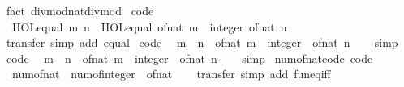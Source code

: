 \begin{isabellebody}
\ {\isacharparenleft}fact\ divmod{\isacharunderscore}nat{\isacharunderscore}div{\isacharunderscore}mod{\isacharparenright}%
\endisatagproof
{\isafoldproof}%
%
\isadelimproof
\isanewline
%
\endisadelimproof
\isanewline
{}\isamarkupfalse%
\ {\isacharbrackleft}code{\isacharbrackright}{\isacharcolon}\isanewline
\ \ {\isachardoublequoteopen}HOL{\isachardot}equal\ m\ n\ {\isacharequal}\ HOL{\isachardot}equal\ {\isacharparenleft}of{\isacharunderscore}nat\ m\ {\isacharcolon}{\isacharcolon}\ integer{\isacharparenright}\ {\isacharparenleft}of{\isacharunderscore}nat\ n{\isacharparenright}{\isachardoublequoteclose}\isanewline
%
\isadelimproof
\ \ %
\endisadelimproof
%
\isatagproof
{}\isamarkupfalse%
\ transfer\ {\isacharparenleft}simp\ add{\isacharcolon}\ equal{\isacharparenright}%
\endisatagproof
{\isafoldproof}%
%
\isadelimproof
\isanewline
%
\endisadelimproof
\isanewline
{}\isamarkupfalse%
\ {\isacharbrackleft}code{\isacharbrackright}{\isacharcolon}\isanewline
\ \ {\isachardoublequoteopen}m\ {\isasymle}\ n\ {\isasymlongleftrightarrow}\ {\isacharparenleft}of{\isacharunderscore}nat\ m\ {\isacharcolon}{\isacharcolon}\ integer{\isacharparenright}\ {\isasymle}\ of{\isacharunderscore}nat\ n{\isachardoublequoteclose}\isanewline
%
\isadelimproof
\ \ %
\endisadelimproof
%
\isatagproof
{}\isamarkupfalse%
\ simp%
\endisatagproof
{\isafoldproof}%
%
\isadelimproof
\isanewline
%
\endisadelimproof
\isanewline
{}\isamarkupfalse%
\ {\isacharbrackleft}code{\isacharbrackright}{\isacharcolon}\isanewline
\ \ {\isachardoublequoteopen}m\ {\isacharless}\ n\ {\isasymlongleftrightarrow}\ {\isacharparenleft}of{\isacharunderscore}nat\ m\ {\isacharcolon}{\isacharcolon}\ integer{\isacharparenright}\ {\isacharless}\ of{\isacharunderscore}nat\ n{\isachardoublequoteclose}\isanewline
%
\isadelimproof
\ \ %
\endisadelimproof
%
\isatagproof
{}\isamarkupfalse%
\ simp%
\endisatagproof
{\isafoldproof}%
%
\isadelimproof
\isanewline
%
\endisadelimproof
\isanewline
{}\isamarkupfalse%
\ num{\isacharunderscore}of{\isacharunderscore}nat{\isacharunderscore}code\ {\isacharbrackleft}code{\isacharbrackright}{\isacharcolon}\isanewline
\ \ {\isachardoublequoteopen}num{\isacharunderscore}of{\isacharunderscore}nat\ {\isacharequal}\ num{\isacharunderscore}of{\isacharunderscore}integer\ {\isasymcirc}\ of{\isacharunderscore}nat{\isachardoublequoteclose}\isanewline
%
\isadelimproof
\ \ %
\endisadelimproof
%
\isatagproof
{}\isamarkupfalse%
\ transfer\ {\isacharparenleft}simp\ add{\isacharcolon}\ fun{\isacharunderscore}eq{\isacharunderscore}iff{\isacharparenright}%

\end{isabellebody}

